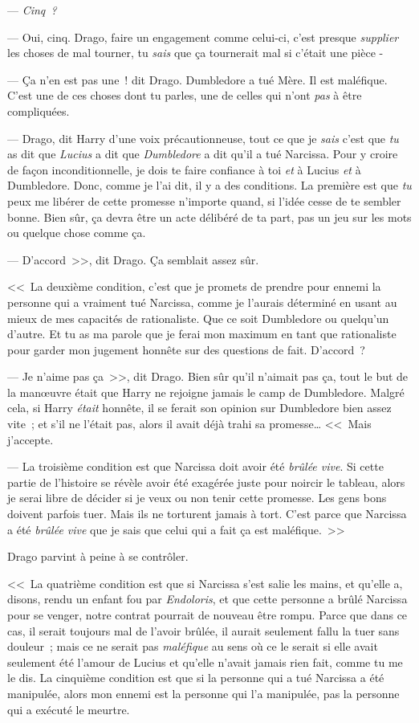 --- \emph{Cinq~?}

--- Oui, cinq. Drago, faire un engagement comme celui-ci, c'est presque \emph{supplier} les choses de mal tourner, tu \emph{sais} que ça tournerait mal si c'était une pièce -

--- Ça n'en est pas une~! dit Drago. Dumbledore a tué Mère. Il est maléfique. C'est une de ces choses dont tu parles, une de celles qui n'ont \emph{pas} à être compliquées.

--- Drago, dit Harry d'une voix précautionneuse, tout ce que je \emph{sais} c'est que \emph{tu} as dit que \emph{Lucius} a dit que \emph{Dumbledore} a dit qu'il a tué Narcissa. Pour y croire de façon inconditionnelle, je dois te faire confiance à toi \emph{et} à Lucius \emph{et} à Dumbledore. Donc, comme je l'ai dit, il y a des conditions. La première est que \emph{tu} peux me libérer de cette promesse n'importe quand, si l'idée cesse de te sembler bonne. Bien sûr, ça devra être un acte délibéré de ta part, pas un jeu sur les mots ou quelque chose comme ça.

--- D'accord~>>, dit Drago. Ça semblait assez sûr.

<<~La deuxième condition, c'est que je promets de prendre pour ennemi la personne qui a vraiment tué Narcissa, comme je l'aurais déterminé en usant au mieux de mes capacités de rationaliste. Que ce soit Dumbledore ou quelqu'un d'autre. Et tu as ma parole que je ferai mon maximum en tant que rationaliste pour garder mon jugement honnête sur des questions de fait. D'accord~?

--- Je n'aime pas ça~>>, dit Drago. Bien sûr qu'il n'aimait pas ça, tout le but de la manœuvre était que Harry ne rejoigne jamais le camp de Dumbledore. Malgré cela, si Harry \emph{était} honnête, il se ferait son opinion sur Dumbledore bien assez vite~; et s'il ne l'était pas, alors il avait déjà trahi sa promesse… <<~Mais j'accepte.

--- La troisième condition est que Narcissa doit avoir été \emph{brûlée vive}. Si cette partie de l'histoire se révèle avoir été exagérée juste pour noircir le tableau, alors je serai libre de décider si je veux ou non tenir cette promesse. Les gens bons doivent parfois tuer. Mais ils ne torturent jamais à tort. C'est parce que Narcissa a été \emph{brûlée vive} que je sais que celui qui a fait ça est maléfique.~>>

Drago parvint à peine à se contrôler.

<<~La quatrième condition est que si Narcissa s'est salie les mains, et qu'elle a, disons, rendu un enfant fou par \emph{Endoloris}, et que cette personne a brûlé Narcissa pour se venger, notre contrat pourrait de nouveau être rompu. Parce que dans ce cas, il serait toujours mal de l'avoir brûlée, il aurait seulement fallu la tuer sans douleur~; mais ce ne serait pas \emph{maléfique} au sens où ce le serait si elle avait seulement été l'amour de Lucius et qu'elle n'avait jamais rien fait, comme tu me le dis. La cinquième condition est que si la personne qui a tué Narcissa a été manipulée, alors mon ennemi est la personne qui l'a manipulée, pas la personne qui a exécuté le meurtre.

